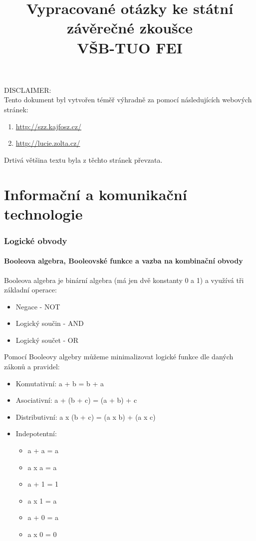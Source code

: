 \documentclass[10pt,a4paper]{article}
\title{Vypracované otázky ke státní závěrečné zkoušce \\VŠB-TUO FEI}
\begin{document}
\maketitle
\begin{center}
\large{DISCLAIMER:}\\
Tento dokument byl vytvořen téměř výhradně za pomocí následujících webových stránek: 
\begin{enumerate}
\centering
\item \url{http://szz.kajfosz.cz/}
\item \url{http://lucie.zolta.cz/}
\end{enumerate}
Drtivá většina textu byla z těchto stránek převzata. 
\end{center}
\newpage
\tableofcontents
\newpage
\part{Informační a komunikační technologie}
\newpage
\section{Logické obvody}
\subsection{Booleova algebra, Booleovské funkce a vazba na kombinační obvody}
Booleova algebra je binární algebra (má jen dvě konstanty 0 a 1) a využívá tři základní operace:
\begin{itemize}
\item Negace - NOT
\item Logický součin - AND
\item Logický součet - OR
\end{itemize}
Pomocí Booleovy algebry můžeme minimalizovat logické funkce dle daných zákonů a pravidel:

\begin{itemize}
\item Komutativní: a + b = b + a
\item Asociativní: a + (b + c) = (a + b) + c
\item Distributivní: a x (b + c) = (a x b) + (a x c)
\item Indepotentní:
\begin{itemize}
\item a + a = a
\item a x a = a
\item a + 1 = 1
\item a x 1 = a
\item a + 0 = a
\item a x 0 = 0
\end{itemize}

\end{itemize}
\end{document}
